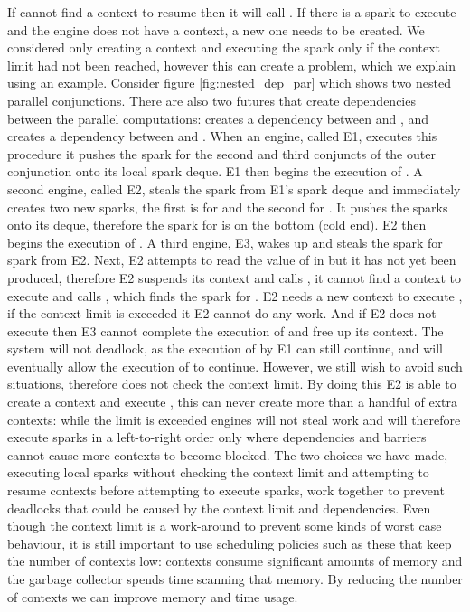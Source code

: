 If \idle cannot find a context to resume then it
will call \tryrunlocalspark.
If there is a spark to execute and the engine does not have a context,
a new one needs to be created.
We considered only creating a context and executing the spark only if the
context limit had not been reached,
however this can create a problem, which we explain using an example.
Consider figure \ref{fig:nested_dep_par} which shows two nested
parallel conjunctions.
There are also two futures that create dependencies between the parallel
computations:
 creates a dependency between  and ,
and  creates a dependency between  and .
When an engine, called E1,
executes this procedure it pushes the spark for the second and third
conjuncts of the outer conjunction onto its local spark deque.
E1 then begins the execution of .
A second engine, called E2,
steals the spark from E1's spark deque and immediately creates two new
sparks, the first is for  and the second for .
It pushes the sparks onto its deque,
therefore the spark for  is on the bottom (cold end).
E2 then begins the execution of .
A third engine, E3,
wakes up and steals the spark for  spark from E2.
Next,
E2 attempts to read the value of  in  but it has not yet
been produced,
therefore E2 suspends its context and calls \idle, it cannot find a context
to execute and calls \tryrunlocalspark,
which finds the spark for .
E2 needs a new context to execute , if the context limit is exceeded
it E2 cannot do any work.
And if E2 does not execute  then E3 cannot complete the execution of
 and free up its context.
The system will not deadlock, as the execution of  by E1 can still
continue, and will eventually allow the execution of  to continue.
However, we still wish to avoid such situations,
therefore \tryrunlocalspark does not check the context limit.
By doing this E2 is able to create a context and execute ,
this can never create more than a handful of extra contexts:
while the limit is exceeded engines will not steal work and will therefore
execute sparks in a left-to-right order only where dependencies and barriers
cannot cause more contexts to become blocked.
The two choices we have made,
executing local sparks without checking the context limit and
attempting to resume contexts before attempting to execute sparks,
work together to prevent deadlocks that could be caused by
the context limit and dependencies.
Even though the context limit is a work-around to prevent some kinds of
worst case behaviour,
it is still important to use scheduling policies such as these that keep the
number of contexts low:
contexts consume significant amounts of memory and
the garbage collector spends time scanning that memory.
By reducing the number of contexts we can improve memory and time usage.

